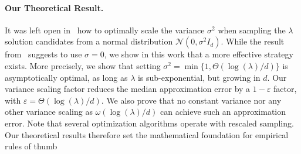 \paragraph{Our Theoretical Result.} It was left open in~\cite{icmldoe} how to optimally scale the variance $\sigma^2$ when sampling the $\lambda$ solution candidates from a normal distribution $\mathcal{N}(0,\sigma^2 I_d)$. While the result from~\cite{icmldoe} suggests to use $\sigma=0$, we show in this work that a more effective strategy exists. More precisely, we show that setting $\sigma^2=\min\{1,\Theta(\log(\lambda)/d)\}$ is asymptotically optimal, as long as $\lambda$ is sub-exponential, but growing in $d$. Our variance scaling factor reduces the median approximation error by a $1-\varepsilon$ factor, with $\varepsilon=\Theta(\log(\lambda)/d)$. We also prove that no constant variance nor any other variance scaling as $\omega(\log(\lambda)/d)$ can achieve such an approximation error. Note that several optimization algorithms operate with rescaled sampling. Our theoretical results  therefore set the mathematical foundation for empirical rules of thumb 
